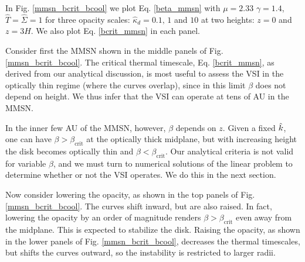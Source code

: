 In Fig. \ref{mmsn_bcrit_bcool} we plot Eq. \ref{beta_mmsn}  with $\mu
=2.33$ $\gamma=1.4$, $\hat{T}=\hat{\Sigma}=1$ for three
opacity scales: $\hat{\kappa}_d=0.1, \,1 $ and $10$ at two heights:
$z=0$ and $z=3H$. We also plot Eq. \ref{bcrit_mmsn} in each panel. 

Consider first the MMSN shown in the middle panels of 
Fig. \ref{mmsn_bcrit_bcool}. The critical thermal timescale,
Eq. \ref{bcrit_mmsn}, as derived from our analytical discussion, is
most useful to assess the VSI in the optically thin regime (where the
curves overlap), since in this limit $\beta$ does not depend on
height. We thus infer that the VSI can operate at tens of AU in the
MMSN.  

In the inner few AU of the MMSN, however, $\beta$ depends on $z$. 
Given a fixed $\hat{k}$, one can have $\beta > \beta_\mathrm{crit}$ at
the optically thick midplane, but with increasing height the disk 
becomes optically thin and $\beta<\beta_\mathrm{crit}$. Our analytical
criteria is not valid for variable $\beta$, and we must turn to
numerical solutions of the linear problem to determine whether or not
the VSI operates. We do this in the next section.   
 
Now consider lowering the opacity, as shown in the top panels of
Fig. \ref{mmsn_bcrit_bcool}. The curves shift inward, but are also
raised. In fact, lowering the opacity by an order of magnitude renders 
$\beta > \beta_\mathrm{crit}$ even away from the midplane. This is
expected to stabilize the disk. Raising the opacity, as shown in 
the lower panels of Fig. \ref{mmsn_bcrit_bcool}, decreases the thermal
timescales, but shifts the curves outward, so the instability is
restricted to larger radii.  


